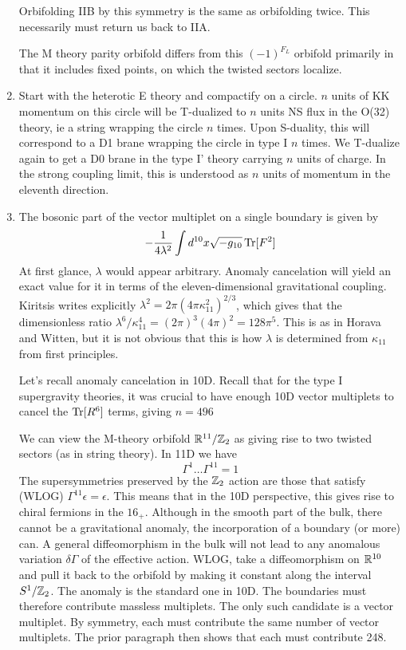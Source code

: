 \documentclass[11pt, class=article, crop=false]{standalone}
\begin{document}
\begin{enumerate}
	Orbifolding IIB by this symmetry is the same as orbifolding twice. This necessarily must return us back to IIA. 
	
	The M theory parity orbifold differs from this $(-1)^{F_L}$ orbifold primarily in that it includes fixed points, on which the twisted sectors localize. 
	
	\item Start with the heterotic E theory and compactify on a circle. $n$ units of KK momentum on this circle will be T-dualized to $n$ units NS flux in the O(32) theory, ie a string wrapping the circle $n$ times. Upon S-duality, this will correspond to a D1 brane wrapping the circle in type I $n$ times. We T-dualize again to get a D0 brane in the type I' theory carrying $n$ units of charge. In the strong coupling limit, this is understood as $n$ units of momentum in the eleventh direction.  
	
	\item 
	The bosonic part of the vector multiplet on a single boundary is given by
	\[
		-\frac{1}{4 \lambda^2} \int d^{10} x \sqrt{-g_{10}} \,\mathrm{Tr}[F^2]
	\]
	At first glance, $\lambda$ would appear arbitrary. Anomaly cancelation will yield an exact value for it in terms of the eleven-dimensional gravitational coupling. Kiritsis writes explicitly $\lambda^2 = 2 \pi (4 \pi \kappa_{11}^2)^{2/3}$, which gives that the dimensionless ratio $\lambda^6/\kappa_{11}^4 = (2 \pi)^3 (4 \pi)^2 = 128 \pi^5$. This is as in Horava and Witten, but it is not obvious that this is how $\lambda$ is determined from $\kappa_{11}$ from first principles. 
	
	Let's recall anomaly cancelation in 10D. Recall that for the type I supergravity theories, it was crucial to have enough 10D vector multiplets to cancel the $\mathrm{Tr}[R^6]$ terms, giving $n=496$
	
	We can view the M-theory orbifold $\mathbb{R}^{11}/\mathbb{Z}_2$ as giving rise to two twisted sectors (as in string theory). In 11D we have
	\[
		\Gamma^1 \dots \Gamma^{11} = 1
	\]
	 The supersymmetries preserved by the $\mathbb{Z}_2$ action are those that satisfy (WLOG) $\Gamma^{11} \epsilon = \epsilon$. This means that in the 10D perspective, this gives rise to chiral fermions in the $16_+$. Although in the smooth part of the bulk, there cannot be a gravitational anomaly, the incorporation of a boundary (or more) can. A general diffeomorphism in the bulk will not lead to any anomalous variation $\delta \Gamma$ of the effective action. WLOG, take a diffeomorphism on $\mathbb{R}^{10}$ and pull it back to the orbifold by making it constant along the interval $S^1/\mathbb{Z}_2$. The anomaly is the standard one in 10D. The boundaries must therefore contribute massless multiplets. The only such candidate is a vector multiplet. By symmetry, each must contribute the same number of vector multiplets. The prior paragraph then shows that each must contribute 248.  
	 

\end{enumerate}
\end{document}
